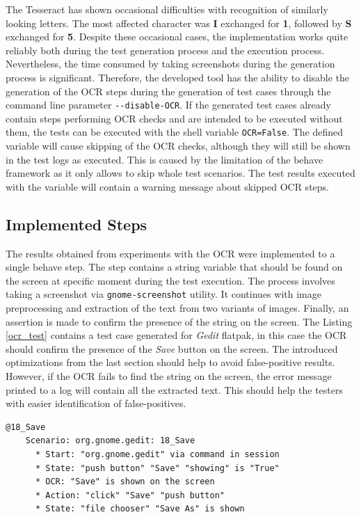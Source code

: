 The Tesseract has shown occasional difficulties with recognition of similarly looking letters. The most affected character was \textbf{I} exchanged for \textbf{1}, followed by \textbf{S} exchanged for \textbf{5}. Despite these occasional cases, the implementation works quite reliably both during the test generation process and the execution process. Nevertheless, the time consumed by taking screenshots during the generation process is significant. Therefore, the developed tool has the ability to disable the generation of the OCR steps during the generation of test cases through the command line parameter \texttt{-{}-disable-OCR}. If the generated test cases already contain steps performing OCR checks and are intended to be executed without them, the tests can be executed with the shell variable \texttt{OCR=False}. The defined variable will cause skipping of the OCR checks, although they will still be shown in the test logs as executed. This is caused by the limitation of the behave framework as it only allows to skip whole test scenarios. The test results executed with the variable will contain a warning message about skipped OCR steps.

\subsection{Implemented Steps}
The results obtained from experiments with the OCR were implemented to a single behave step. The step contains a string variable that should be found on the screen at specific moment during the test execution. The process involves taking a screenshot via \texttt{gnome-screenshot} utility. It continues with image preprocessing and extraction of the text from two variants of images. Finally, an assertion is made to confirm the presence of the string on the screen. The Listing \ref{ocr_test} contains a test case generated for \textit{Gedit} flatpak, in this case the OCR should confirm the presence of the \textit{Save} button on the screen. The introduced optimizations from the last section should help to avoid false-positive results. However, if the OCR fails to find the string on the screen, the error message printed to a log will contain all the extracted text. This should help the testers with easier identification of false-positives.

\begin{lstlisting}[language=Gherkin,caption={Test case demonstrating the OCR integration in test cases},label={ocr_test}]
    @18_Save
    Scenario: org.gnome.gedit: 18_Save
      * Start: "org.gnome.gedit" via command in session
      * State: "push button" "Save" "showing" is "True"
      * OCR: "Save" is shown on the screen
      * Action: "click" "Save" "push button"
      * State: "file chooser" "Save As" is shown
\end{lstlisting}


